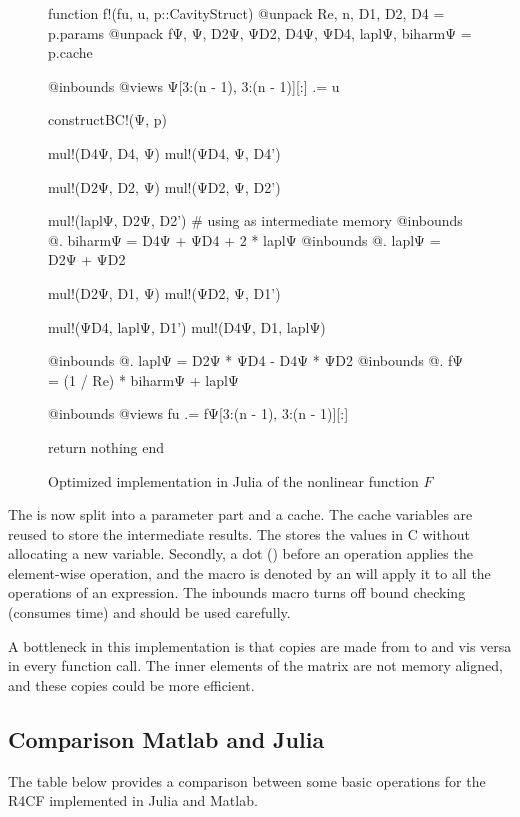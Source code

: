 \begin{figure}[h]
\begin{jllisting}
function f!(fu, u, p::CavityStruct)
    @unpack Re, n, D1, D2, D4 = p.params
    @unpack fΨ, Ψ, D2Ψ, ΨD2, D4Ψ, ΨD4, laplΨ, biharmΨ = p.cache

    @inbounds @views Ψ[3:(n - 1), 3:(n - 1)][:] .= u

    constructBC!(Ψ, p)

    mul!(D4Ψ, D4, Ψ)
    mul!(ΨD4, Ψ, D4')

    mul!(D2Ψ, D2, Ψ)
    mul!(ΨD2, Ψ, D2')

    mul!(laplΨ, D2Ψ, D2') # using as intermediate memory
    @inbounds @. biharmΨ = D4Ψ + ΨD4 + 2 * laplΨ
    @inbounds @. laplΨ = D2Ψ + ΨD2

    mul!(D2Ψ, D1, Ψ)
    mul!(ΨD2, Ψ, D1')

    mul!(ΨD4, laplΨ, D1')
    mul!(D4Ψ, D1, laplΨ)

    @inbounds @. laplΨ = D2Ψ * ΨD4 - D4Ψ * ΨD2
    @inbounds @. fΨ = (1 / Re) * biharmΨ + laplΨ

    @inbounds @views fu .= fΨ[3:(n - 1), 3:(n - 1)][:]

    return nothing
end
\end{jllisting}
\caption{Optimized implementation in Julia of the nonlinear function $F$}
\end{figure}

The  is now split into a parameter part and a cache.
The cache variables are reused to store the intermediate results. The
 stores the values in C without allocating a new variable.
Secondly, a dot () before an operation applies the element-wise
operation, and the macro is denoted by an  will apply it to all the
operations of an expression. The  inbounds macro turns off bound
checking (consumes time) and should be used carefully.

A bottleneck in this implementation is that copies are made from  to
 and vis versa in every function call. The inner elements of the
matrix  are not memory aligned, and these copies could be more
efficient.

\subsection{Comparison Matlab and Julia}

The table below provides a comparison between some basic operations for the
R4CF implemented in Julia and Matlab. 

